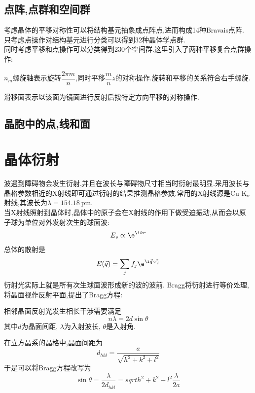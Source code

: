 \documentclass{ctexbook}
\begin{document}
\subsection{点阵,点群和空间群}
考虑晶体的平移对称性可以将结构基元抽象成点阵点,进而构成14种Bravais点阵.\\
\indent 只考虑点操作对结构基元进行分类可以得到32种晶体学点群.\\
\indent 同时考虑平移和点操作可以分类得到230个空间群.这里引入了两种平移复合点群操作:
\begin{definition}[螺旋轴]
    $n_m$螺旋轴表示旋转$\dfrac{2\pi m}{n}$,同时平移$\dfrac{m}{n}z$的对称操作.旋转和平移的关系符合右手螺旋.
\end{definition}
\begin{definition}[滑移面]
    滑移面表示以该面为镜面进行反射后按特定方向平移的对称操作.
\end{definition}
\subsection{晶胞中的点,线和面}

\section{晶体衍射}
波遇到障碍物会发生衍射,并且在波长与障碍物尺寸相当时衍射最明显.采用波长与晶格参数相近的X射线即可通过衍射的结果推测晶格参数.常用的X射线源是Cu $\text{K}_{\alpha}$射线,其波长为$\lambda=\SI{154.18}{\pico\meter}$.\\
\indent 当X射线照射到晶体时,晶体中的原子会在X射线的作用下做受迫振动,从而会以原子球为单位对外发射次生的球面波:
\[E_s\propto \e^{\i kr}\]
总体的散射是
\[E(\vec{q})=\sum_{j}f_j\e^{\i\vec{q}\cdot\vec{r_j}}\]
衍射光实际上就是所有次生球面波形成新的波的波前. Bragg将衍射进行等价处理,将晶面视作反射平面,提出了Bragg方程:
\begin{theorem}[Bragg方程]
    相邻晶面反射光发生相长干涉需要满足
    \[n\lambda=2d\sin\theta\]
    其中$d$为晶面间距, $\lambda$为入射波长, $\theta$是入射角.
\end{theorem}
在立方晶系的晶格中,晶面间距为
\[d_{hkl}=\dfrac{a}{\sqrt{h^2+k^2+l^2}}\]
于是可以将Bragg方程改写为
\[\sin\theta=\dfrac{\lambda}{2d_{hkl}}=sqrt{h^2+k^2+l^2}\dfrac{\lambda}{2a}\]
\end{document}
